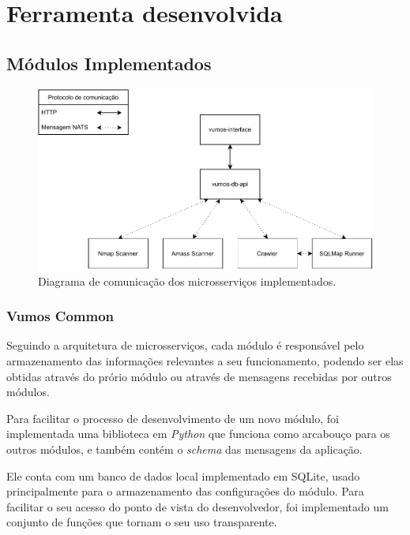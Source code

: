 
\chapter{Ferramenta desenvolvida}
\label{cap:metodologia}


\section{Módulos Implementados}

    \begin{figure}[H]
        \includegraphics[scale=0.8]{figuras/vumos-Microservices.pdf}
        \caption{Diagrama de comunicação dos microsserviços implementados.\label{fig:microservices}}
    \end{figure}

    \subsection{Vumos Common}
    Seguindo a arquitetura de microsserviços, cada módulo é responsável pelo armazenamento das informações relevantes a seu funcionamento, podendo ser elas obtidas através do prório módulo ou através de mensagens recebidas por outros módulos. 
    
    Para facilitar o processo de desenvolvimento de um novo módulo, foi implementada uma biblioteca em \textit{Python} que funciona como arcabouço para os outros módulos, e também contém o \textit{schema} das mensagens da aplicação.
    
    Ele conta com um banco de dados local implementado em SQLite, usado principalmente para o armazenamento das configurações do módulo. Para facilitar o seu acesso do ponto de vista do desenvolvedor, foi implementado um conjunto de funções que tornam o seu uso transparente.
    
